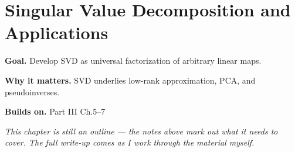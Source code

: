 \chapter{Singular Value Decomposition and Applications}
\label{ch:03-linear-algebra-08}

\begin{chapterintro}
\textbf{Goal.} Develop SVD as universal factorization of arbitrary linear maps.

\textbf{Why it matters.} SVD underlies low-rank approximation, PCA, and pseudoinverses.

\textbf{Builds on.} Part III Ch.5–7
\end{chapterintro}

\textit{This chapter is still an outline --- the notes above mark out what it needs to cover. The full write-up comes as I work through the material myself.}
